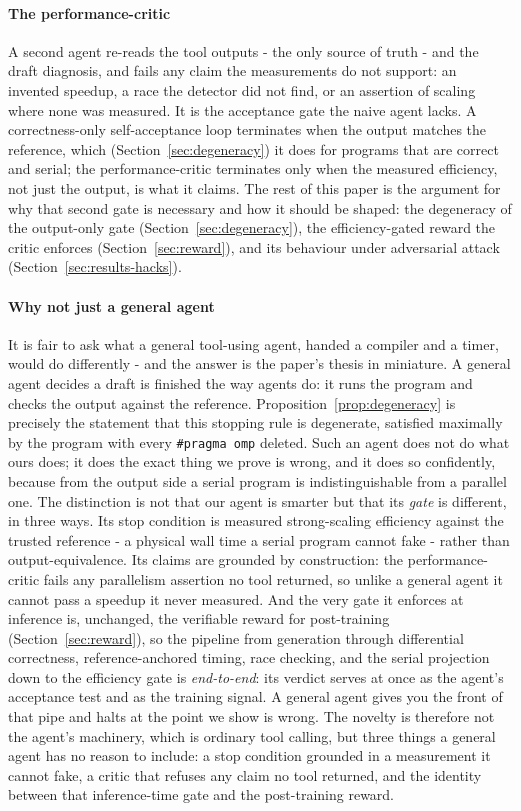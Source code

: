 \paragraph*{The performance-critic}
A second agent re-reads the tool outputs - the only source of truth - and the
draft diagnosis, and fails any claim the measurements do not support: an
invented speedup, a race the detector did not find, or an assertion of scaling
where none was measured. It is the acceptance gate the naive agent lacks. A
correctness-only self-acceptance loop terminates when the output matches the
reference, which (Section~\ref{sec:degeneracy}) it does for programs that are
correct and serial; the performance-critic terminates only when the measured
efficiency, not just the output, is what it claims. The rest of this paper is
the argument for why that second gate is necessary and how it should be shaped:
the degeneracy of the output-only gate (Section~\ref{sec:degeneracy}), the
efficiency-gated reward the critic enforces (Section~\ref{sec:reward}), and its
behaviour under adversarial attack (Section~\ref{sec:results-hacks}).

\paragraph*{Why not just a general agent}
It is fair to ask what a general tool-using agent, handed a compiler and a timer,
would do differently - and the answer is the paper's thesis in miniature. A
general agent decides a draft is finished the way agents do: it runs the program
and checks the output against the reference. Proposition~\ref{prop:degeneracy} is
precisely the statement that this stopping rule is degenerate, satisfied
maximally by the program with every \texttt{\#pragma omp} deleted. Such an agent
does not do what ours does; it does the exact thing we prove is wrong, and it
does so confidently, because from the output side a serial program is
indistinguishable from a parallel one. The distinction is not that our agent is
smarter but that its \emph{gate} is different, in three ways. Its stop condition
is measured strong-scaling efficiency against the trusted reference - a physical
wall time a serial program cannot fake - rather than output-equivalence. Its
claims are grounded by construction: the performance-critic fails any parallelism
assertion no tool returned, so unlike a general agent it cannot pass a speedup it
never measured. And the very gate it enforces at inference is, unchanged, the
verifiable reward for post-training (Section~\ref{sec:reward}), so the pipeline
from generation through differential correctness, reference-anchored timing, race
checking, and the serial projection down to the efficiency gate is
\emph{end-to-end}: its verdict serves at once as the agent's acceptance test and
as the training signal. A general agent gives you the front of that pipe and
halts at the point we show is wrong. The novelty is therefore not the agent's
machinery, which is ordinary tool calling, but three things a general agent has
no reason to include: a stop condition grounded in a measurement it cannot fake,
a critic that refuses any claim no tool returned, and the identity between that
inference-time gate and the post-training reward.

